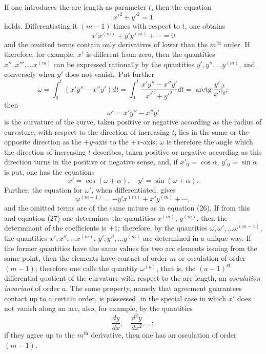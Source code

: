 \documentclass[11pt,a4paper,leqno]{article}
\begin{document}
If one introduces the arc length as parameter $t$, then the equation
\[
x'^2+y'^2=1
\]
holds. Differentiating it $(m-1)$ times with respect to $t$, one obtains
\begin{equation}\tag{26}
x'x^{(m)}+y'y^{(m)}+\cdots=0
\end{equation}
and the omitted terms contain only derivatives of lower than the $m^{\mathrm{th}}$ order. If therefore, for example, $x'$ is different from zero, then the quantities $x'',x''',\ldots x^{(m)}$ can be expressed rationally by the quantities $y',y'',\ldots y^{(m)}$, and conversely when $y'$ does not vanish. Put further
\[
\omega=\int_0^t(x'y''-x''y')dt=\int_0^t\frac{x'y''-x''y'}{x'^2+y'^2}dt=\operatorname{arctg}\frac{y'}{x'}\bigg|_0^t;
\]
then
\[
\omega'=x'y''-x''y'
\]
is the curvature of the curve, taken positive or negative according as the radius of curvature, with respect to the direction of increasing $t$, lies in the same or the opposite direction as the $+y$-axis to the $+x$-axis; $\omega$ is therefore the angle which the direction of increasing $t$ describes,
taken positive or negative according as this direction turns in the positive or negative sense, and, if $x'_0=\cos\alpha$, $y'_0=\sin\alpha$ is put, one has the equations
\[
x'=\cos(\omega+\alpha),\quad y'=\sin(\omega+\alpha).
\]
Further, the equation for $\omega'$, when differentiated, gives
\begin{equation}\tag{27}
\omega^{(m-1)}=-y'x^{(m)}+x'y^{(m)}+\cdots,
\end{equation}
and the omitted terms are of the same nature as in equation (26). If from this and equation (27) one determines the quantities $x^{(m)}$, $y^{(m)}$, then the determinant of the coefficients is $+1$; therefore, by the quantities $\omega,\omega',\ldots\omega^{(m-1)}$, the quantities $x',x'',\ldots x^{(m)}$, $y',y'',\ldots y^{(m)}$ are determined in a unique way. If the former quantities have the same values for two arc elements issuing from the same point, then the elements have contact of order $m$ or osculation of order $(m-1)$; therefore one calls the quantity $\omega^{(a)}$, that is, the $(a-1)^{\mathrm{st}}$ differential quotient of the curvature with respect to the arc length, an \emph{osculation invariant} of order $a$. The same property, namely that agreement guarantees contact up to a certain order, is possessed, in the special case in which $x'$ does not vanish along an arc, also, for example, by the quantities
\[
\frac{dy}{dx},\quad \frac{d^2y}{dx^2},\ldots;
\]
if they agree up to the $m^{\mathrm{th}}$ derivative, then one has an osculation of order $(m-1)$.
\end{document}
